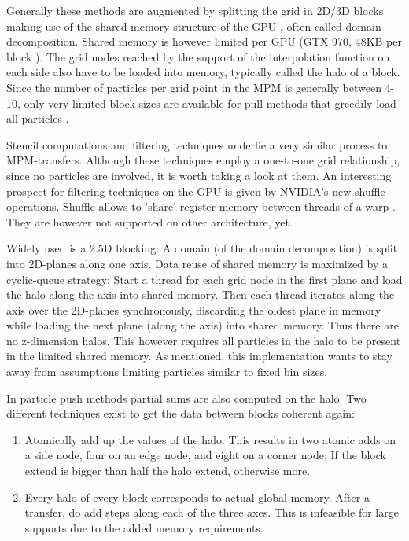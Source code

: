 \documentclass[m,times]{cgMA}
\begin{document}
Generally these methods are augmented by splitting the grid in 2D/3D blocks making use of the shared memory structure of the GPU \cite{PIC:GPU} \cite{honig2010generic} \cite{MPM:GPU}, often called domain decomposition. Shared memory is however limited per GPU (GTX 970, 48KB per block \cite{NVIDIA:GTX970}). The grid nodes reached by the support of the interpolation function on each side also have to be loaded into memory, typically called the halo of a block. Since the number of particles per grid point in the MPM is generally between 4-10, only very limited block sizes are available for pull methods that greedily load all particles \cite{MPM:SNOW}.

Stencil computations and filtering techniques underlie a very similar process to MPM-transfers. Although these techniques employ a one-to-one grid relationship, since no particles are involved, it is worth taking a look at them.
An interesting prospect for filtering techniques on the GPU is given by NVI\-DIA's new shuffle operations. Shuffle allows to 'share' register memory between threads of a warp \cite{NVIDIA:SHUFFLE}. They are however not supported on other architecture, yet.

Widely used is a 2.5D blocking: A domain (of the domain decomposition) is split into 2D-planes along one axis. Data reuse of shared memory is maximized by a cyclic-queue strategy: Start a thread for each grid node in the first plane and load the halo along the axis into shared memory. Then each thread iterates along the axis over the 2D-planes synchronously, discarding the oldest plane in memory while loading the next plane (along the axis) into shared memory. Thus there are no z-dimension halos. This however requires all particles in the halo to be present in the limited shared memory. As mentioned, this implementation wants to stay away from assumptions limiting particles similar to fixed bin sizes. \cite{brandvik2010sblock} \cite{williams2007scientific} \cite{krotkiewski2013efficient}

In particle push methods partial sums are also computed on the halo. Two different techniques exist to get the data between blocks coherent again:
\begin{enumerate}
\item Atomically add up the values of the halo. This results in two atomic adds on a side node, four on an edge node, and eight on a corner node; If the block extend is bigger than half the halo extend, otherwise more.
\item Every halo of every block corresponds to actual global memory. After a transfer, do add steps along each of the three axes. This is infeasible for large supports due to the added memory requirements. \cite{crassin2011interactive}
\end{enumerate}
\end{document}
